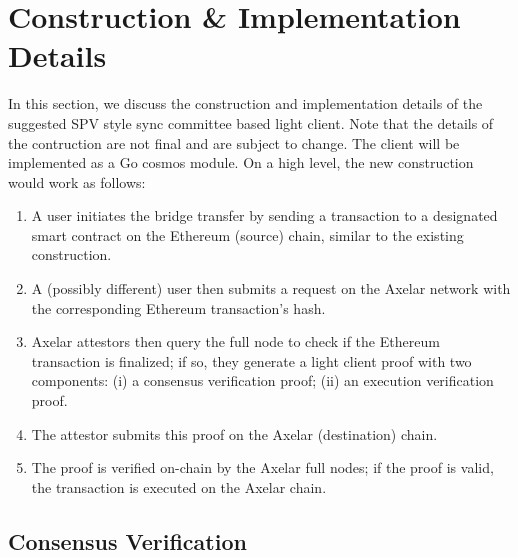 \section{Construction \& Implementation Details}

In this section, we discuss the construction and implementation details 
of the suggested SPV style sync committee based light client. Note that the details of 
the contruction are not final and are subject to change. The client will be implemented 
as a Go cosmos module. On a high level, the new construction would work as follows:
\begin{enumerate}
    \item A user initiates the bridge transfer by sending a transaction to a
        designated smart contract on the Ethereum (source) chain, similar to
        the existing construction.
    \item A (possibly different) user then submits a request on the Axelar
        network with the corresponding Ethereum transaction's hash.
    \item Axelar attestors then query the full node to check if the Ethereum
        transaction is finalized; if so, they generate a light client proof with
        two components: (i) a consensus verification proof; (ii) an
        execution verification proof.
    \item The attestor submits this proof on the Axelar (destination)
        chain.
    \item The proof is verified on-chain by the Axelar full nodes; if the proof
        is valid, the transaction is executed on the Axelar chain.
\end{enumerate}

\subsection{Consensus Verification}

